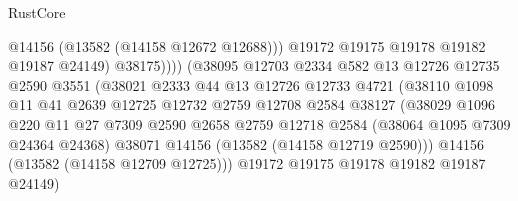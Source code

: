 \begin{lexlean}{RustCore}
\begin{coremodule}
                                          @14156
                                          (@13582 (@14158 @12672 @12688)))
                                        @19172
                                        @19175
                                        @19178
                                        @19182
                                        @19187
                                        @24149)
                                      @38175))))
                              (@38095
                                @12703
                                @2334
                                @582
                                @13
                                @12726
                                @12735
                                @2590
                                @3551
                                (@38021
                                  @2333
                                  @44
                                  @13
                                  @12726
                                  @12733
                                  @4721
                                  (@38110
                                    @1098
                                    @11
                                    @41
                                    @2639
                                    @12725
                                    @12732
                                    @2759
                                    @12708
                                    @2584
                                    @38127
                                    (@38029
                                      @1096
                                      @220
                                      @11
                                      @27
                                      @7309
                                      @2590
                                      @2658
                                      @2759
                                      @12718
                                      @2584
                                      (@38064 @1095 @7309 @24364 @24368)
                                      @38071
                                      @14156
                                      (@13582 (@14158 @12719 @2590)))
                                    @14156
                                    (@13582 (@14158 @12709 @12725)))
                                  @19172
                                  @19175
                                  @19178
                                  @19182
                                  @19187
                                  @24149)

\end{coremodule}
\end{lexlean}
